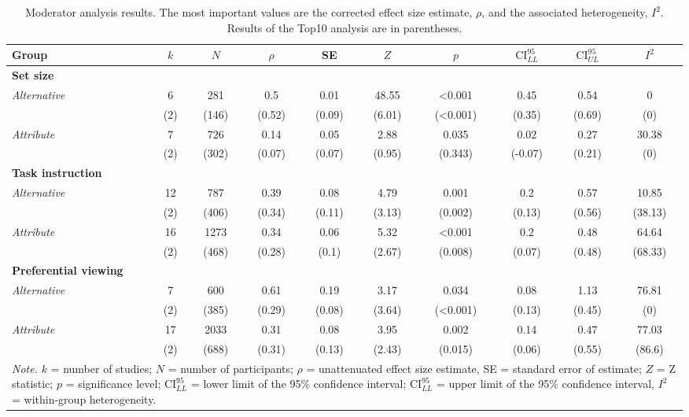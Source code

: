 \begin{table}[ht]
\centering
\caption{Moderator analysis results. The most important values are the corrected effect size estimate, $\rho$, and the associated heterogeneity, $I^2$. 
                Results of the Top10 analysis are in parentheses.} 
\label{tab:mod_results}
\begingroup\small
\begin{tabular}{lccccccccc}
  \hline
Group & $k$ & $N$ & $\rho$ & SE & $Z$ & $p$ & $\textrm{CI}^{95}_{LL}$ & $\textrm{CI}^{95}_{UL}$ & $I^2$ \\ 
  \hline
\textbf{Set size} &  &  &  &  &  &  &  &  &  \\ 
  \hspace{2mm}\textit{Alternative} & 6 & 281 & 0.5 & 0.01 & 48.55 & <0.001 & 0.45 & 0.54 & 0 \\ 
   & (2) & (146) & (0.52) & (0.09) & (6.01) & (<0.001) & (0.35) & (0.69) & (0) \\ 
  \hspace{2mm}\textit{Attribute} & 7 & 726 & 0.14 & 0.05 & 2.88 & 0.035 & 0.02 & 0.27 & 30.38 \\ 
   & (2) & (302) & (0.07) & (0.07) & (0.95) & (0.343) & (-0.07) & (0.21) & (0) \\ 
  \textbf{Task instruction} &  &  &  &  &  &  &  &  &  \\ 
  \hspace{2mm}\textit{Alternative} & 12 & 787 & 0.39 & 0.08 & 4.79 & 0.001 & 0.2 & 0.57 & 10.85 \\ 
   & (2) & (406) & (0.34) & (0.11) & (3.13) & (0.002) & (0.13) & (0.56) & (38.13) \\ 
  \hspace{2mm}\textit{Attribute} & 16 & 1273 & 0.34 & 0.06 & 5.32 & <0.001 & 0.2 & 0.48 & 64.64 \\ 
   & (2) & (468) & (0.28) & (0.1) & (2.67) & (0.008) & (0.07) & (0.48) & (68.33) \\ 
  \textbf{Preferential viewing} &  &  &  &  &  &  &  &  &  \\ 
  \hspace{2mm}\textit{Alternative} & 7 & 600 & 0.61 & 0.19 & 3.17 & 0.034 & 0.08 & 1.13 & 76.81 \\ 
   & (2) & (385) & (0.29) & (0.08) & (3.64) & (<0.001) & (0.13) & (0.45) & (0) \\ 
  \hspace{2mm}\textit{Attribute} & 17 & 2033 & 0.31 & 0.08 & 3.95 & 0.002 & 0.14 & 0.47 & 77.03 \\ 
   & (2) & (688) & (0.31) & (0.13) & (2.43) & (0.015) & (0.06) & (0.55) & (86.6) \\ 
   \hline 
 \multicolumn{10}{p{0.9\textwidth}}{\scriptsize{\textit{Note.} $k$ = number of studies; $N$ = number of participants; $\rho$ = unattenuated effect size estimate, SE = standard error of estimate; $Z$ = Z statistic; $p$ = significance level; $\textrm{CI}^{95}_{LL}$ = lower limit of the 95\% confidence interval; $\textrm{CI}^{95}_{LL}$ = upper limit of the 95\% confidence interval, $I^2$ = within-group heterogeneity.}} 
\end{tabular}
\endgroup
\end{table}
